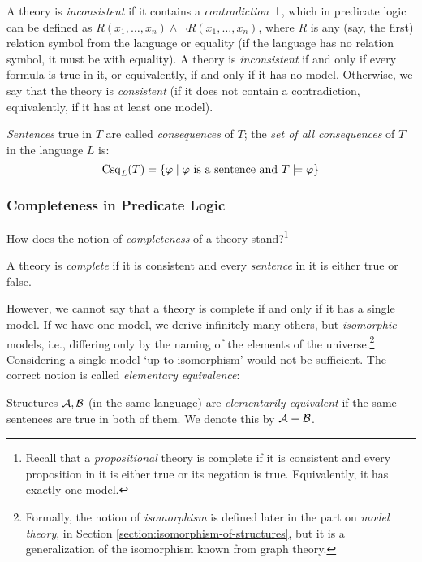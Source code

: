 A theory is \emph{inconsistent} if it contains a \emph{contradiction} $\bot$, which in predicate logic can be defined as $R(x_1,\dots,x_n)\land \neg R(x_1,\dots,x_n)$, where $R$ is any (say, the first) relation symbol from the language or equality (if the language has no relation symbol, it must be with equality). A theory is \emph{inconsistent} if and only if every formula is true in it, or equivalently, if and only if it has no model. Otherwise, we say that the theory is \emph{consistent} (if it does not contain a contradiction, equivalently, if it has at least one model).

\emph{Sentences} true in $T$ are called \emph{consequences} of $T$; the \emph{set of all consequences} of $T$ in the language $L$ is:
$$
\operatorname{Csq}_L(T)=\{\varphi\mid\text{$\varphi$ is a sentence and }T\models \varphi\}
$$

\subsubsection{Completeness in Predicate Logic}
How does the notion of \emph{completeness} of a theory stand?\footnote{Recall that a \emph{propositional} theory is complete if it is consistent and every proposition in it is either true or its negation is true. Equivalently, it has exactly one model.}

\begin{definition}
    A theory is \emph{complete} if it is consistent and every \emph{sentence} in it is either true or false.
\end{definition}

However, we cannot say that a theory is complete if and only if it has a single model. If we have one model, we derive infinitely many others, but \emph{isomorphic} models, i.e., differing only by the naming of the elements of the universe.\footnote{Formally, the notion of \emph{isomorphism} is defined later in the part on \emph{model theory}, in Section \ref{section:isomorphism-of-structures}, but it is a generalization of the isomorphism known from graph theory.} Considering a single model `up to isomorphism' would not be sufficient. The correct notion is called \emph{elementary equivalence}:

\begin{definition}
    Structures $\mathcal{A},\mathcal{B}$ (in the same language) are \emph{elementarily equivalent} if the same sentences are true in both of them. We denote this by $\mathcal{A}\equiv\mathcal{B}$.
\end{definition}


